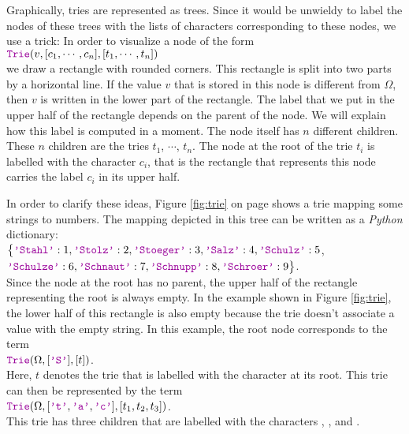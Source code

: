 Graphically, tries are represented as trees.  Since it would be unwieldy to label the nodes of these
trees with the lists of characters corresponding to these nodes, we use a trick:  In order to
visualize a node of the form \\[0.2cm]
\hspace*{1.3cm} 
$\mytt{Trie}(v, [c_1, \cdots, c_n], [t_1, \cdots, t_n])$ \\[0.2cm]
we draw a rectangle with rounded corners.  This rectangle is split into two parts by a horizontal line.
If the value  $v$ that is stored in this node is different from $\Omega$, then $v$ is
written in the lower part of the rectangle.  The label that we put in the upper half of the rectangle
depends on the parent of the node.  We will explain how this label is computed in a moment.
The node itself has $n$ different children.  These $n$ children are the tries
$t_1$, $\cdots$, $t_n$.  The node at the root of the trie $t_i$ is labelled with the character $c_i$,
that is the rectangle that represents this node carries the label $c_i$ in its upper half.

In order to clarify these ideas, Figure  \ref{fig:trie} on page \pageref{fig:trie} shows a trie
mapping some strings to numbers.  The mapping depicted in this tree can be written as a \textsl{Python}
dictionary: 
\\[0.2cm]
\hspace*{1.3cm} $ \bigl\{ \mytt{'Stahl'}: 1, \mytt{'Stolz'}: 2, \mytt{'Stoeger'}: 3, \mytt{'Salz'}: 4, \mytt{'Schulz'}: 5$, \\[0.2cm]
\hspace*{1.5cm} $         \mytt{'Schulze'}: 6, \mytt{'Schnaut'}: 7, \mytt{'Schnupp'}: 8, \mytt{'Schroer'}: 9\bigr\}$. \\[0.2cm]
Since the node at the root has no parent, the upper half of  the rectangle representing the root is
always empty.  In the example shown in Figure \ref{fig:trie}, the lower half of this rectangle is also empty
because the trie doesn't associate a value with the empty string.  In this example, the root node corresponds
to the term  
\\[0.2cm]
\hspace*{1.3cm}
 $\mytt{Trie}(\Omega,[\mytt{'S'}], [t])$. 
\\[0.2cm]
Here,  $t$ denotes the trie that is labelled with the character   at its root.
This trie can then be represented by the term  \\[0.2cm]
\hspace*{1.3cm} 
$\mytt{Trie}(\Omega,[\mytt{'t'},\mytt{'a'},\mytt{'c'}], [t_1, t_2, t_3])$. \\[0.2cm]
This trie has three children that are labelled with the characters  , , and .

